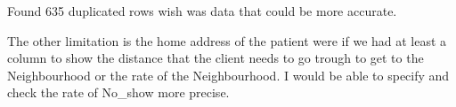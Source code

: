 \documentclass[11pt]{article}
\begin{document}
Found 635 duplicated rows wish was data that could be more accurate.

The other limitation is the home address of the patient were if we had
at least a column to show the distance that the client needs to go
trough to get to the Neighbourhood or the rate of the Neighbourhood. I
would be able to specify and check the rate of No\_show more precise.


    
    
    
    
\end{document}
